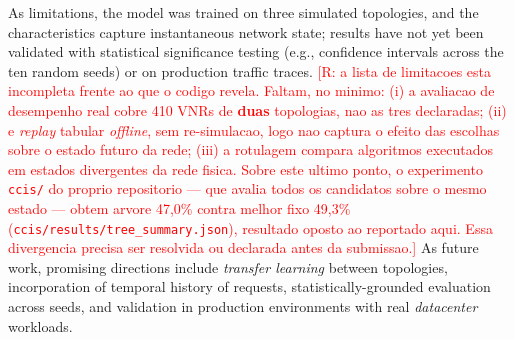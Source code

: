 \documentclass[runningheads]{llncs}
\begin{document}
As limitations, the model was trained on three simulated topologies, and the characteristics capture instantaneous network state; results have not yet been validated with statistical significance testing (e.g., confidence intervals across the ten random seeds) or on production traffic traces. \textcolor{red}{[R: a lista de limitacoes esta incompleta frente ao que o codigo revela. Faltam, no minimo: (i) a avaliacao de desempenho real cobre 410 VNRs de \textbf{duas} topologias, nao as tres declaradas; (ii) e \emph{replay} tabular \emph{offline}, sem re-simulacao, logo nao captura o efeito das escolhas sobre o estado futuro da rede; (iii) a rotulagem compara algoritmos executados em estados divergentes da rede fisica. Sobre este ultimo ponto, o experimento \texttt{ccis/} do proprio repositorio --- que avalia todos os candidatos sobre o mesmo estado --- obtem arvore 47,0\% contra melhor fixo 49,3\% (\texttt{ccis/results/tree\_summary.json}), resultado oposto ao reportado aqui. Essa divergencia precisa ser resolvida ou declarada antes da submissao.]}
As future work, promising directions include \textit{transfer learning} between topologies, incorporation of temporal history of requests, statistically-grounded evaluation across seeds, and validation in production environments with real \textit{datacenter} workloads.




\end{document}
